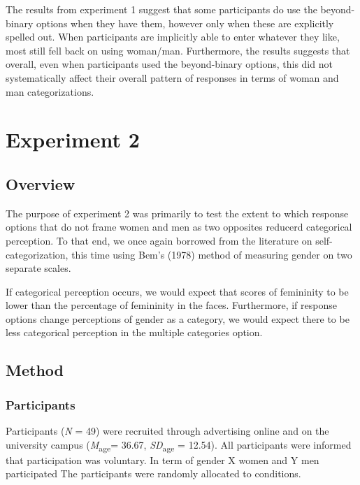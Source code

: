 \documentclass[
  man]{apa7}
\begin{document}
The results from experiment 1 suggest that some participants do use the beyond-binary options when they have them, however only when these are explicitly spelled out. When participants are implicitly able to enter whatever they like, most still fell back on using woman/man. Furthermore, the results suggests that overall, even when participants used the beyond-binary options, this did not systematically affect their overall pattern of responses in terms of woman and man categorizations.

\hypertarget{experiment-2}{%
\section{Experiment 2}\label{experiment-2}}

\hypertarget{overview}{%
\subsection{Overview}\label{overview}}

The purpose of experiment 2 was primarily to test the extent to which response options that do not frame women and men as two opposites reducerd categorical perception. To that end, we once again borrowed from the literature on self-categorization, this time using Bem's (1978) method of measuring gender on two separate scales.

If categorical perception occurs, we would expect that scores of femininity to be lower than the percentage of femininity in the faces. Furthermore, if response options change perceptions of gender as a category, we would expect there to be less categorical perception in the multiple categories option.

\hypertarget{method-1}{%
\subsection{Method}\label{method-1}}

\hypertarget{participants-1}{%
\subsubsection{Participants}\label{participants-1}}

Participants (\emph{N} = 49) were recruited through advertising online and on the university campus (\emph{M}\textsubscript{age}= 36.67, \emph{SD}\textsubscript{age} = 12.54). All participants were informed that participation was voluntary. In term of gender X women and Y men participated The participants were randomly allocated to conditions.
\end{document}

